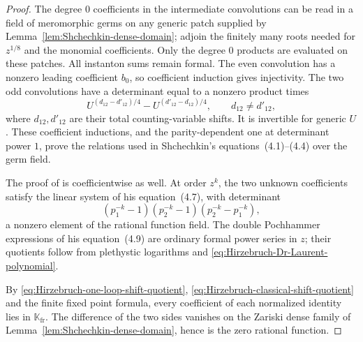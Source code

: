 \documentclass{amsart}
\theoremstyle{definition}
\numberwithin{equation}{section}
\newcommand{\K}{\mathbb K}
\begin{document}
\begin{proof}
The degree \(0\) coefficients in the intermediate convolutions can be read in a field of meromorphic germs on any generic patch supplied by Lemma~\ref{lem:Shchechkin-dense-domain}; adjoin the finitely many roots needed for \(z^{1/8}\) and the monomial coefficients.  Only the degree \(0\) products are evaluated on these patches.  All instanton sums remain formal.  The even convolution has a nonzero leading coefficient \(b_0\), so coefficient induction gives injectivity.  The two odd convolutions have a determinant equal to a nonzero product times
\[
 U^{(d_{12}-d'_{12})/4}
 -U^{(d'_{12}-d_{12})/4},
 \qquad d_{12}\ne d'_{12},
\]
where \(d_{12},d'_{12}\) are their total counting-variable shifts.  It is invertible for generic \(U\).  These coefficient inductions, and the parity-dependent one at determinant power \(1\), prove the relations used in Shchechkin's equations~(4.1)--(4.4) over the germ field.

The proof of \cite[Proposition~4.1]{Shchechkin} is coefficientwise as well.  At order \(z^k\), the two unknown coefficients satisfy the linear system of his equation~(4.7), with determinant
\[
 (p_1^{-k}-1)(p_2^{-k}-1)(p_2^{-k}-p_1^{-k}),
\]
a nonzero element of the rational function field.  The double Pochhammer expressions of his equation~(4.9) are ordinary formal power series in \(z\); their quotients follow from plethystic logarithms and \eqref{eq:Hirzebruch-Dr-Laurent-polynomial}.

By \eqref{eq:Hirzebruch-one-loop-shift-quotient}, \eqref{eq:Hirzebruch-classical-shift-quotient} and the finite fixed point formula, every coefficient of each normalized identity lies in \(\K_{\mathrm{fr}}\).  The difference of the two sides vanishes on the Zariski dense family of Lemma~\ref{lem:Shchechkin-dense-domain}, hence is the zero rational function.
\end{proof}
\end{document}
